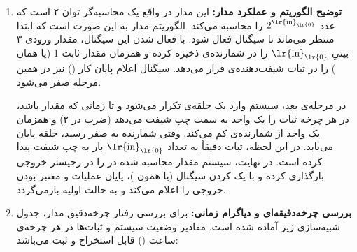 \question{}

\begin{enumerate}
    \item \textbf{توضیح الگوریتم و عملکرد مدار:}
          این مدار در واقع یک محاسبه‌گر توان ۲ است که عدد $2^{\text{\lr{in}}_\text{\lr{0}}}$ را محاسبه می‌کند. الگوریتم مدار به این صورت است که ابتدا منتظر می‌ماند تا سیگنال  فعال شود. با فعال شدن این سیگنال، مقدار ورودی ۳ بیتیِ $\text{\lr{in}}_\text{\lr{0}}$ را در شمارنده‌ی  ذخیره کرده و همزمان مقدار ثابت 1 (یا همان ) را در ثبات شیفت‌دهنده‌ی  قرار می‌دهد. سیگنال اعلام پایان کار () نیز در همین مرحله صفر می‌شود.

          در مرحله‌ی بعد، سیستم وارد یک حلقه‌ی تکرار می‌شود و تا زمانی که مقدار  باشد، در هر چرخه ثبات  را یک واحد به سمت چپ شیفت می‌دهد (ضرب در ۲) و همزمان یک واحد از شمارنده‌ی  کم می‌کند. وقتی شمارنده به صفر رسید، حلقه پایان می‌یابد. در این لحظه، ثبات  دقیقاً به تعداد $\text{\lr{in}}_\text{\lr{0}}$ بار به چپ شیفت پیدا کرده است. در نهایت، سیستم مقدار محاسبه شده در  را در رجیستر خروجی  بارگذاری کرده و با یک کردن سیگنال  (یا همون )، پایان عملیات و معتبر بودن خروجی را اعلام می‌کند و به حالت اولیه بازمی‌گردد.

    \item \textbf{بررسی چرخه‌دقیقه‌ای و دیاگرام زمانی:}
          برای بررسی رفتار چرخه‌دقیق مدار، جدول شبیه‌سازی زیر آماده شده است. مقادیر وضعیت سیستم و ثبات‌ها در هر چرخه‌ی ساعت () قابل استخراج و ثبت می‌باشد:


\end{enumerate}
